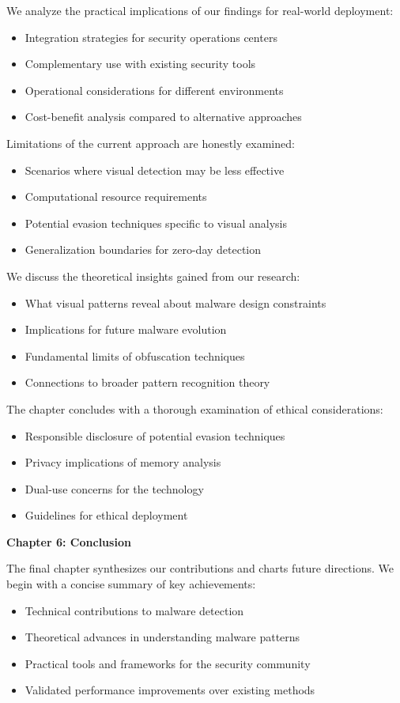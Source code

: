 We analyze the practical implications of our findings for real-world deployment:
\begin{itemize}
\item Integration strategies for security operations centers
\item Complementary use with existing security tools
\item Operational considerations for different environments
\item Cost-benefit analysis compared to alternative approaches
\end{itemize}

Limitations of the current approach are honestly examined:
\begin{itemize}
\item Scenarios where visual detection may be less effective
\item Computational resource requirements
\item Potential evasion techniques specific to visual analysis
\item Generalization boundaries for zero-day detection
\end{itemize}

We discuss the theoretical insights gained from our research:
\begin{itemize}
\item What visual patterns reveal about malware design constraints
\item Implications for future malware evolution
\item Fundamental limits of obfuscation techniques
\item Connections to broader pattern recognition theory
\end{itemize}

The chapter concludes with a thorough examination of ethical considerations:
\begin{itemize}
\item Responsible disclosure of potential evasion techniques
\item Privacy implications of memory analysis
\item Dual-use concerns for the technology
\item Guidelines for ethical deployment
\end{itemize}

\textbf{Chapter 6: Conclusion}

The final chapter synthesizes our contributions and charts future directions. We begin with a concise summary of key achievements:
\begin{itemize}
\item Technical contributions to malware detection
\item Theoretical advances in understanding malware patterns
\item Practical tools and frameworks for the security community
\item Validated performance improvements over existing methods
\end{itemize}

